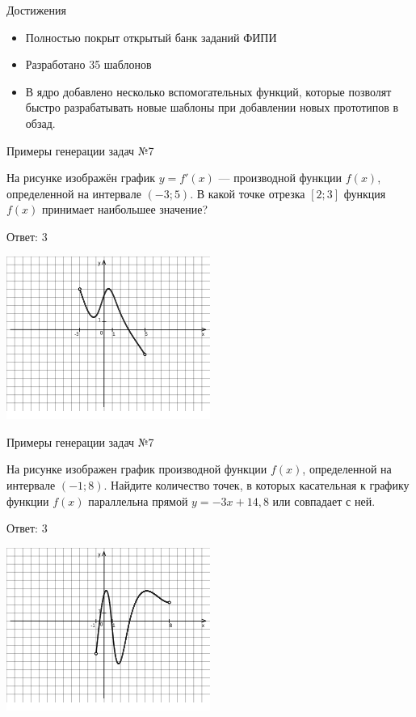 \documentclass[aspectratio=169]{beamer}
\begin{document}
\begin{frame}{Достижения}
    \begin{itemize}
        \item Полностью покрыт открытый банк заданий ФИПИ
        \item Разработано 35 шаблонов
        \item В ядро добавлено несколько вспомогательных функций, которые позволят быстро разрабатывать новые шаблоны при добавлении новых прототипов в обзад.
    \end{itemize}
    
\end{frame}

\begin{frame}{Примеры генерации задач №7}
    
    \begin{multicols}{2}
        На рисунке изображён график $y=f'(x)$ — производной функции $f(x)$, определенной на интервале $(-3;5)$. В какой точке отрезка $[2; 3]$ функция $f(x)$ принимает наибольшее значение?

        Ответ: $3$

        \includegraphics[width=0.5\textwidth]{images/9299084059373277n0}
    \end{multicols}
          
\end{frame}

\begin{frame}{Примеры генерации задач №7}
    
    \begin{multicols}{2}
        На рисунке изображен график производной функции $f(x)$, определенной на интервале $(-1; 8)$. Найдите количество точек, в которых касательная к графику функции $f(x)$ параллельна прямой $y=-3x+ 14{,}8 $ или совпадает с ней.

        Ответ: $3$

        \includegraphics[width=0.5\textwidth]{images/776525944899729n0}
      \end{multicols}
        
   
\end{frame}
\end{document}
